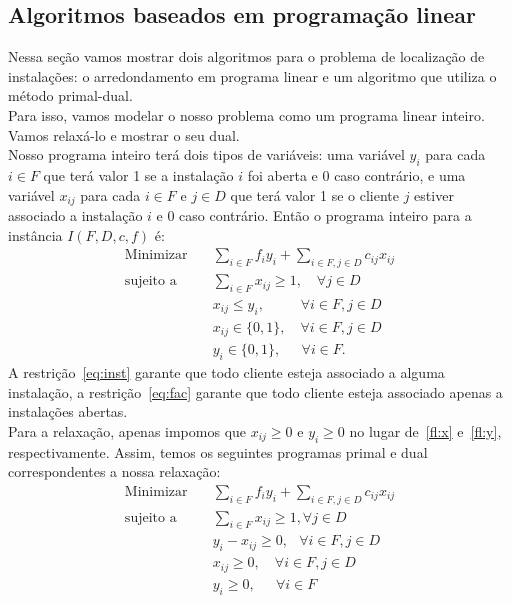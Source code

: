 \documentclass[12pt]{article}
\begin{document}
\subsection{Algoritmos baseados em programação linear}
Nessa seção vamos mostrar dois algoritmos para o problema de localização de instalações: o arredondamento em programa linear e um algoritmo que utiliza o método primal-dual. \\
Para isso, vamos modelar o nosso problema como um programa linear inteiro. Vamos relaxá-lo e mostrar o seu dual. \\
Nosso programa inteiro terá dois tipos de variáveis: uma variável $y_i$ para cada $i \in F$ que terá valor 1 se a instalação $i$ foi aberta e 0 caso contrário, e uma variável $x_{ij}$ para cada $i \in F$ e $j \in D$ que terá valor 1 se o cliente $j$ estiver associado a instalação $i$ e 0 caso contrário. Então o programa inteiro para a instância $I(F,D,c,f)$ é:
\begin{align}
 \text{Minimizar} \quad & \sum_{i \in F}f_iy_i + \sum_{i\in F,j\in D}c_{ij}x_{ij} \nonumber \\
 \text{sujeito a} \quad & \sum_{i\in F} x_{ij}\geq1, \quad \forall j \in D \label{eq:inst}\\
 &x_{ij} \leq y_i,\quad \quad \; \; \forall i\in F,j\in D \label{eq:fac} \\
 &x_{ij} \in \{0,1\} ,\quad \forall i\in F,j\in D \label{fl:x}\\
 &y_i \in \{0,1\}, \quad \; \,\forall i\in F \label{fl:y}.
\end{align}
A restrição~\eqref{eq:inst} garante que todo cliente esteja associado a alguma instalação, a restrição~\eqref{eq:fac} garante que todo cliente esteja associado apenas a instalações abertas.\\ 
Para a relaxação, apenas impomos que $x_{ij} \geq 0$ e $y_i \geq 0$ no lugar de~\eqref{fl:x} e~\eqref{fl:y}, respectivamente. Assim, temos os seguintes programas primal e dual correspondentes a nossa relaxação:
    \begin{align}
        \text{Minimizar} \quad & \sum_{i \in F}f_iy_i + \sum_{i\in F,j\in D}c_{ij}x_{ij} \tag{P1} \label{P1}\\
        \text{sujeito a} \quad & \sum_{i\in F} x_{ij}\geq1,  \forall j \in D \tag{P2} \label{P2}\\
        &y_i - x_{ij} \geq 0, \, \; \; \forall i\in F,j\in D \tag{P3} \label{P3}\\
        &x_{ij} \geq 0,\quad \forall i\in F,j\in D\tag{P4}\label{P4}\\
        &y_i \geq 0, \quad \; \,\forall i\in F \tag{P5} \label{P5}
       \end{align}
\end{document}
